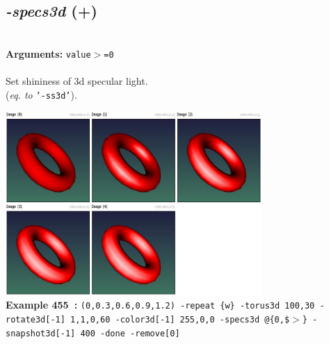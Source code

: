 \documentclass[a4paper,11pt,twoside]{book}
\begin{document}
\subsection{\emph{-specs3d} (+)}\vspace*{-0.5em}
~\\\textbf{Arguments: } 
{\small \texttt{value$>$=0}}\\~\\
Set shininess of 3d specular light.
~\\(\emph{eq. to} {\small \texttt{'-ss3d'}}).
\begin{center}\includegraphics[keepaspectratio=true,height=7cm,width=\textwidth]{img/gmic_def455.jpg}\\
{\footnotesize \textbf{Example 455~:} \texttt{(0,0.3,0.6,0.9,1.2) -repeat \{w\} -torus3d 100,30 -rotate3d[-1] 1,1,0,60 -color3d[-1] 255,0,0 -specs3d @\{0,\$$>$\} -snapshot3d[-1] 400 -done -remove[0]}}
\end{center}
\end{document}
